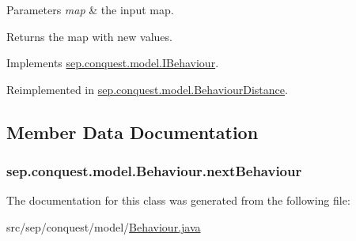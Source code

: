 \begin{DoxyParams}{Parameters}
{\em map} & the input map. \\
\hline
\end{DoxyParams}
\begin{DoxyReturn}{Returns}
the map with new values. 
\end{DoxyReturn}


Implements \hyperlink{interfacesep_1_1conquest_1_1model_1_1_i_behaviour_ad8b3d5a56d55d6e2cd4576c9ae2d2633}{sep.conquest.model.IBehaviour}.



Reimplemented in \hyperlink{classsep_1_1conquest_1_1model_1_1_behaviour_distance_a351d79be7ec3599134f3a15bc39fbc2e}{sep.conquest.model.BehaviourDistance}.



\subsection{Member Data Documentation}
\hypertarget{classsep_1_1conquest_1_1model_1_1_behaviour_aa5c8b900275f3c9403784f10a89e50f3}{
\subsubsection[{nextBehaviour}]{ {\bf sep.conquest.model.Behaviour.nextBehaviour}}}
\label{classsep_1_1conquest_1_1model_1_1_behaviour_aa5c8b900275f3c9403784f10a89e50f3}


The documentation for this class was generated from the following file:\begin{DoxyCompactItemize}
\item 
src/sep/conquest/model/\hyperlink{_behaviour_8java}{Behaviour.java}\end{DoxyCompactItemize}
